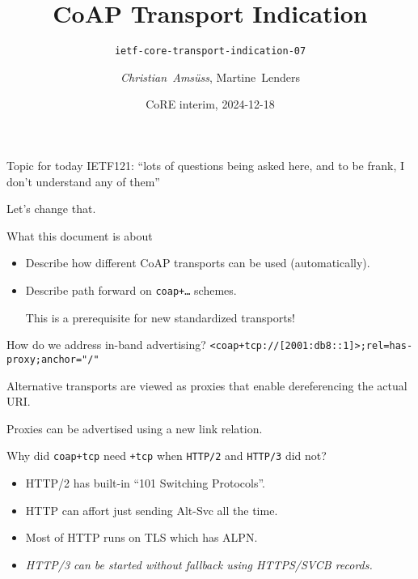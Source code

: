 

\title{CoAP Transport Indication}
\subtitle{\texttt{ietf-core-transport-indication-07}}
\author{\textit{Christian~Amsüss}, Martine~Lenders}
\date{CoRE interim, 2024-12-18}



\frame{\titlepage}

\begin{frame}{Topic for today}\Large
    IETF121: ``lots of questions being asked here, and to be frank, I don't understand any of them''

    \vspace{2cm}

    Let's change that.
\end{frame}

\begin{frame}{What this document is about}\Large
    \begin{itemize}
        \item {\color{gray} Describe how different CoAP transports can be used (automatically).}
        \item Describe path forward on \texttt{coap+…} schemes.

            \bigskip

            This is a prerequisite for new standardized transports!
    \end{itemize}
\end{frame}

\begin{frame}{How do we address in-band advertising?}\Large
    \texttt{<coap+tcp://[2001:db8::1]>;rel=has-proxy;anchor="/"}

    \bigskip

    Alternative transports are viewed as proxies that enable dereferencing the actual URI.

    \bigskip

    Proxies can be advertised using a new link relation.
\end{frame}

\begin{frame}{Why did \texttt{coap+tcp} need \texttt{+tcp} when \texttt{HTTP/2} and \texttt{HTTP/3} did not?}\Large
    \begin{itemize}
        \item HTTP/2 has built-in ``101 Switching Protocols''.
        \item HTTP can affort just sending Alt-Svc all the time.
        \item Most of HTTP runs on TLS which has ALPN.
        \item \textit{HTTP/3 can be started without fallback using  HTTPS/SVCB records.}
    \end{itemize}
\end{frame}

